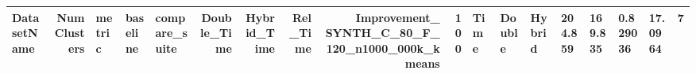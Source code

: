 \begin{tabular}{lrlllrrrrr}
\toprule
DatasetName & NumClusters & metric & baseline & compare_suite & Double_Time & Hybrid_Time & Rel_Time & Improvement_%
\midrule
SYNTH_C_80_F_120_n1000_000k_kmeans & 100 & Time & Double & Hybrid & 204.859 & 169.835 & 0.829036 & 17.0964 & 7 \\
\bottomrule
\end{tabular}
